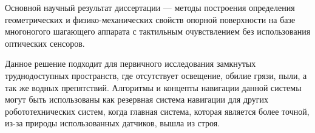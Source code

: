 
Основной  научный  результат  диссертации --- методы построения определения геометрических и физико-механических свойств опорной поверхности на базе многоногого шагающего аппарата с тактильным очувствлением без использования оптических сенсоров.

Данное решение подходит для первичного исследования замкнутых труднодоступных пространств, где отсутствует освещение, обилие грязи, пыли, а так же водных препятствий. Алгоритмы и концепты навигации данной системы могут быть использованы как резервная система навигации для других робототехнических систем, когда главная система, которая является более точной, из-за природы использованных датчиков, вышла из строя.


